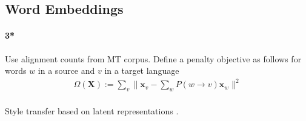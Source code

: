 \documentclass{article}
\newcommand{\x}{{\mathbf x}}
\begin{document}
\subsection*{Word Embeddings}

\paragraph*{\cite{zou2013bilingual} 3*}
Use alignment counts from MT corpus. Define a penalty objective as follows for words $w$ in a source and $v$ in a target language 
\begin{align*}
\Omega(\mathbf X) := \sum_{v} \| \x_{v} - \sum_{w} P(w \to v) \x_w\|^2
\end{align*}

\paragraph*{\cite{hu2017controllable}}

\paragraph*{\cite{shen2017style}} Style transfer based on latent representations \cite{hu2017controllable}. 




%
%
%
%
%
%
%
%
%
%
%
%
%
\end{document}
